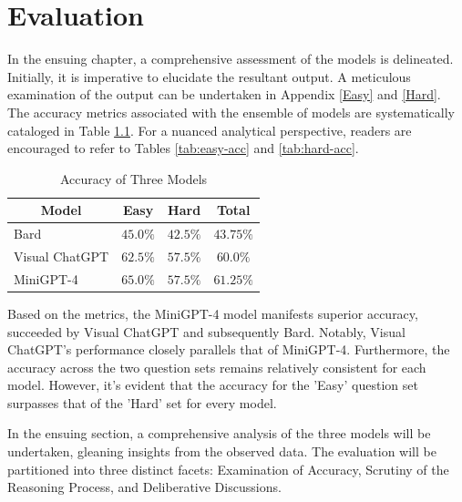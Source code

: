\documentclass[twocolumn,11pt]{report}
\begin{document}

\chapter{Evaluation}\label{chap:evaluation}

In the ensuing chapter, a comprehensive assessment of the models is delineated. Initially, it is imperative to elucidate the resultant output. A meticulous examination of the output can be undertaken in Appendix \ref{Easy} and \ref{Hard}. The accuracy metrics associated with the ensemble of models are systematically cataloged in Table \ref{tab:accuracy}. For a nuanced analytical perspective, readers are encouraged to refer to Tables \ref{tab:easy-acc} and \ref{tab:hard-acc}.
\begin{table}[h]
    \centering
    \caption{Accuracy of Three Models}
    \label{tab:accuracy}
    \begin{tabular}{@{}lccc@{}}
    \toprule
    \multicolumn{1}{c}{Model} & Easy      & Hard & Total \\ \midrule
    Bard                      &  $45.0\%$ & $42.5\%$ &  $43.75\%$ \\
    Visual ChatGPT            &  $62.5\%$ & $57.5\%$ &  $60.0\%$  \\
    MiniGPT-4                 &  $65.0\%$ & $57.5\%$ &  $61.25\%$  \\ \bottomrule
    \end{tabular}
\end{table}

Based on the metrics, the MiniGPT-4 model manifests superior accuracy, succeeded by Visual ChatGPT and subsequently Bard. Notably, Visual ChatGPT's performance closely parallels that of MiniGPT-4. Furthermore, the accuracy across the two question sets remains relatively consistent for each model. However, it's evident that the accuracy for the 'Easy' question set surpasses that of the 'Hard' set for every model.

In the ensuing section, a comprehensive analysis of the three models will be undertaken, gleaning insights from the observed data. The evaluation will be partitioned into three distinct facets: Examination of Accuracy, Scrutiny of the Reasoning Process, and Deliberative Discussions.
\end{document}
